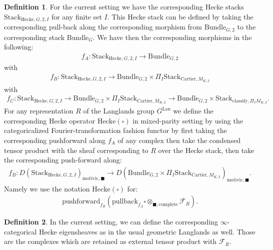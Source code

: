 \documentclass[12pt]{book}
\theoremstyle{definition}
\newtheorem{definition}{Definition}
\begin{document}
\begin{definition}
For the current setting we have the corresponding Hecke stacks $\mathrm{Stack}_{\mathrm{Hecke},G,2,I}$ for any finite set $I$. This Hecke stack can be defined by taking the corresponding pull-back along the corresponding morphism from $\mathrm{Bundle}_{G,2}$ to the corresponding stack $\mathrm{Bundle}_{G}$. We have then the corresponding morphisms in the following:
\begin{align}
f_A: \mathrm{Stack}_{\mathrm{Hecke},G,2,I} \rightarrow \mathrm{Bundle}_{G,2}
\end{align}
with
\begin{align}
f_B: \mathrm{Stack}_{\mathrm{Hecke},G,2,I} \rightarrow \mathrm{Bundle}_{G,2}\times \Pi_I \mathrm{Stack}_{\mathrm{Cartier},M_{K,2}}
\end{align}
with
\begin{align}
f_C: \mathrm{Stack}_{\mathrm{Hecke},G,2,I} \rightarrow \mathrm{Bundle}_{G,2}\times \Pi_I \mathrm{Stack}_{\mathrm{Cartier},M_{K,2}}\rightarrow \mathrm{Bundle}_{G,2}\times \mathrm{Stack}_{\mathrm{classify},\Pi_I M_{K,2}}.
\end{align}
For any representation $R$ of the Langlands group $G^\mathrm{Lan}$ we define the corresponding Hecke operator $\mathrm{Hecke}(\square)$ in mixed-parity setting by using the categoricalized Fourier-transformation fashion functor by first taking the corresponding pushforward along $f_A$ of any complex then take the condensed tensor product with the sheaf corresponding to $R$ over the Hecke stack, then take the corresponding push-forward along:
\begin{align}
f_B: D(\mathrm{Stack}_{\mathrm{Hecke},G,2,I})_{\text{motivic},\blacksquare} \rightarrow D(\mathrm{Bundle}_{G,2}\times \Pi_I \mathrm{Stack}_{\mathrm{Cartier},M_{K,2}})_{\text{motivic},\blacksquare}.
\end{align}
Namely we use the notation $\mathrm{Hecke}(\square)$ for:
\begin{align}
\mathrm{pushforward}_{f_B}(\mathrm{pullback}_{f_A}\square\otimes_{\blacksquare,\mathrm{complete}}\mathcal{F}_R).
\end{align}
\end{definition}


\begin{definition}
In the current setting, we can define the corresponding $\infty$-categorical Hecke eigensheaves as in the usual geometric Langlands as well. Those are the complexes which are retained as external tensor product with $\mathcal{F}_R$.
\end{definition}
\end{document}
